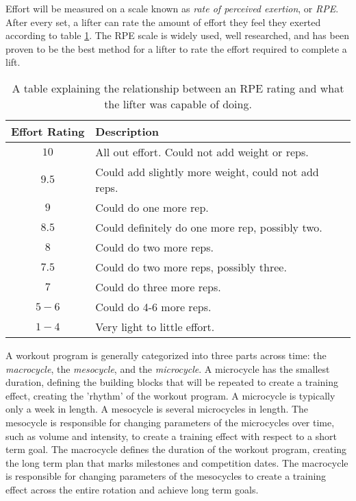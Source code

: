 Effort will be measured on a scale known as \textit{rate of perceived exertion}, or \textit{RPE}. After every set, a lifter can rate the amount of effort they feel they exerted according to table \ref{tab:RPETable}. The RPE scale is widely used, well researched, and has been proven to be the best method for a lifter to rate the effort required to complete a lift. \cite{RPE_ACCURACY}

\begin{table}[h]
    \centering
    \begin{tabular}{c|l}
        Effort Rating & Description \\
        \hline
        $10$ & All out effort. Could not add weight or reps. \\
        $9.5$ & Could add slightly more weight, could not add reps. \\
        $9$ & Could do one more rep. \\
        $8.5$ & Could definitely do one more rep, possibly two. \\
        $8$ & Could do two more reps. \\
        $7.5 $& Could do two more reps, possibly three. \\
        $7$ & Could do three more reps. \\
        $5-6$ & Could do 4-6 more reps. \\
        $1-4$ & Very light to little effort.
    \end{tabular}
    \caption{A table explaining the relationship between an RPE rating and what the lifter was capable of doing.}
    \label{tab:RPETable}
\end{table}

A workout program is generally categorized into three parts across time: the \textit{macrocycle}, the \textit{mesocycle}, and the \textit{microcycle}. A microcycle has the smallest duration, defining the building blocks that will be repeated to create a training effect, creating the 'rhythm' of the workout program. A microcycle is typically only a week in length. A mesocycle is several microcycles in length. The mesocycle is responsible for changing parameters of the microcycles over time, such as volume and intensity, to create a training effect with respect to a short term goal. The macrocycle defines the duration of the workout program, creating the long term plan that marks milestones and competition dates. The macrocycle is responsible for changing parameters of the mesocycles to create a training effect across the entire rotation and achieve long term goals.

